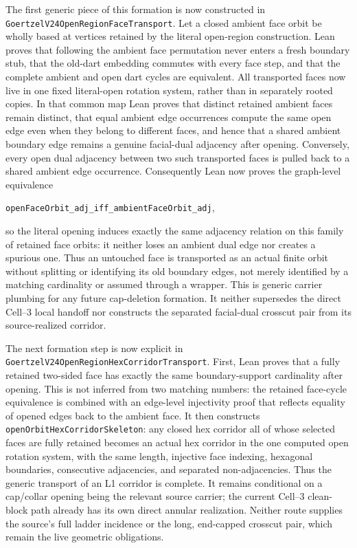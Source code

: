 \documentclass[11pt]{article}
\theoremstyle{definition}
\begin{document}
The first generic piece of this formation is now constructed in
\texttt{GoertzelV24OpenRegionFaceTransport}.  Let a closed ambient face orbit
be wholly based at vertices retained by the literal open-region construction.
Lean proves that following the ambient face permutation never enters a fresh
boundary stub, that the old-dart embedding commutes with every face step, and
that the complete ambient and open dart cycles are equivalent.  All transported
faces now live in one fixed literal-open rotation system, rather than in
separately rooted copies.  In that common map Lean proves that distinct retained
ambient faces remain distinct, that equal ambient edge occurrences compute the
same open edge even when they belong to different faces, and hence that a
shared ambient boundary edge remains a genuine facial-dual adjacency after
opening.  Conversely, every open dual adjacency between two such transported
faces is pulled back to a shared ambient edge occurrence.  Consequently Lean
now proves the graph-level equivalence

\begin{center}
\texttt{openFaceOrbit\_adj\_iff\_ambientFaceOrbit\_adj},
\end{center}

so the literal opening induces exactly the same adjacency relation on this
family of retained face orbits: it neither loses an ambient dual edge nor
creates a spurious one.  Thus an untouched face is transported as an actual finite orbit
without splitting or identifying its old boundary edges, not merely identified
by a matching cardinality or assumed through a wrapper.  This is generic
carrier plumbing for any future cap-deletion formation.  It neither supersedes
the direct Cell--3 local handoff nor constructs the separated facial-dual
crosscut pair from its source-realized corridor.

The next formation step is now explicit in
\texttt{GoertzelV24OpenRegionHexCorridorTransport}.  First, Lean proves that a
fully retained two-sided face has exactly the same boundary-support cardinality
after opening.  This is not inferred from two matching numbers: the retained
face-cycle equivalence is combined with an edge-level injectivity proof that
reflects equality of opened edges back to the ambient face.  It then constructs
\texttt{openOrbitHexCorridorSkeleton}: any closed hex corridor all of whose
selected faces are fully retained becomes an actual hex corridor in the one
computed open rotation system, with the same length, injective face indexing,
hexagonal boundaries, consecutive adjacencies, and separated non-adjacencies.
Thus the generic transport of an L1 corridor is complete.  It remains
conditional on a cap/collar opening being the relevant source carrier; the
current Cell--3 clean-block path already has its own direct annular
realization.  Neither route supplies the source's full ladder incidence or
the long, end-capped crosscut pair, which remain the live geometric
obligations.
\end{document}
